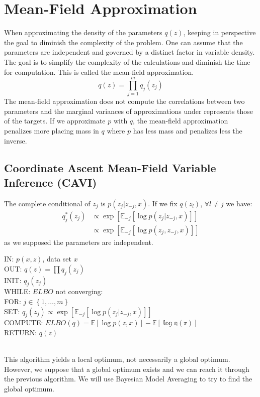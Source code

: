 \section{Mean-Field Approximation}
When approximating the density of the parameters $q(z)$, keeping in perspective the goal to diminish the complexity of the problem. One can assume that the parameters are independent and governed by a distinct factor in variable density. The goal is to simplify the complexity of the calculations and diminish the time for computation. This is called the mean-field approximation.
\begin{equation}
q(z) = \prod_{j=1}^m q_j(z_j)
\label{eq:meanField}
\end{equation}
The mean-field approximation does not compute the correlations between two parameters and the marginal variances of approximations under represents those of the targets. If we approximate $p$ with $q$, the mean-field approximation penalizes more placing mass in $q$ where $p$ has less mass and penalizes less the inverse.

\subsection{Coordinate Ascent Mean-Field Variable Inference (CAVI)}
The complete conditional of $z_j$ is $p(z_j|z_{-j},x)$. If we fix $q(z_l)$, $\forall l \neq j$ we have:
\begin{align}
q^*_j(z_j) &\propto \exp\left[\mathbb{E}_{-j}\left[\log p(z_j|z_{-j},x)\right]\right]\\
&\propto \exp\left[\mathbb{E}_{-j}\left[\log p(z_j,z_{-j},x)\right]\right]
\label{eq:CAVI}
\end{align}
as we supposed the parameters are independent.\\
\newline

\begin{text}
IN: $p(x,z)$, data set $x$\\
OUT: $q(z) = \prod q_j(z_j)$\\
INIT: $q_j(z_j)$\\
WHILE: $ELBO$ not converging:\\
	FOR: $j \in \left\lbrace1, \dots, m\right\rbrace$\\
		SET: $q_j(z_j) \propto \exp\left[\mathbb{E}_{-j}\left[\log p(z_j|z_{-j},x)\right]\right]$\\
	COMPUTE: $ELBO(q) = \mathbb{E}\left[\log p(z,x)\right] - \mathbb{E\left[\log q(z)\right]}$\\
RETURN: $q(z)$
\end{text}
\\
\newline
This algorithm yields a local optimum, not necessarily a global optimum. However, we suppose that a global optimum exists and we can reach it through the previous algorithm. We will use Bayesian Model Averaging to try to find the global optimum.